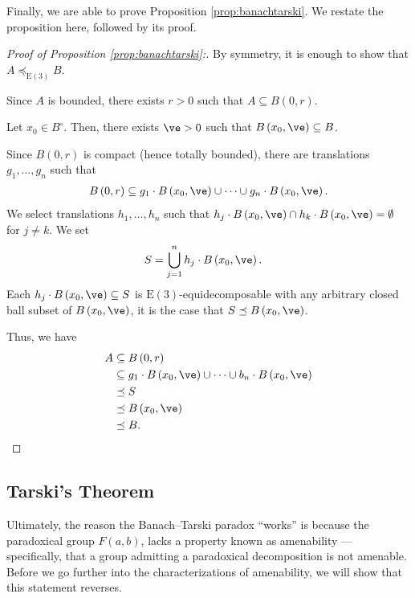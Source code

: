 \documentclass[10pt]{mypackage2}
\begin{document}
Finally, we are able to prove Proposition \ref{prop:banachtarski}. We restate the proposition here, followed by its proof.
\begin{tcolorbox}[blanker,breakable,left=3mm,before skip=10pt, after skip=10pt, borderline west={1pt}{0pt}{blue!50!white},sharp corners,]
\banachtarski*
\end{tcolorbox}
\begin{proof}[Proof of Proposition \ref{prop:banachtarski}:]
  By symmetry, it is enough to show that $A\preceq_{\text{E}(3)} B$.\newline

  Since $A$ is bounded, there exists $r > 0$ such that $A\subseteq B(0,r)$.\newline

  Let $x_0\in B^{\circ}$. Then, there exists $\ve > 0$ such that $B\left(x_0,\ve\right) \subseteq B$.\newline

  Since $B(0,r)$ is compact (hence totally bounded), there are translations $g_1,\dots,g_n$ such that
  \begin{align*}
    B\left(0,r\right) \subseteq g_1\cdot B\left(x_0,\ve\right) \cup \cdots \cup g_n\cdot B\left(x_0,\ve\right).
  \end{align*}
  We select translations $h_1,\dots,h_n$ such that $h_j\cdot B\left(x_0,\ve\right) \cap h_k\cdot B\left(x_0,\ve\right) = \emptyset$ for $j\neq k$. We set
  \begin{align*}
    S &= \bigcup_{j=1}^{n}h_j\cdot B\left(x_0,\ve\right).
  \end{align*}
  Each $h_j\cdot B\left(x_0,\ve\right)\subseteq S$ is $\text{E}(3)$-equidecomposable with any arbitrary closed ball subset of $B\left(x_0,\ve\right)$, it is the case that $S\preceq B\left(x_0,\ve\right)$.\newline

  Thus, we have
  \begin{align*}
    A &\subseteq B\left(0,r\right)\\
      &\subseteq g_1\cdot B\left(x_0,\ve\right)\cup\cdots\cup b_n\cdot B\left(x_0,\ve\right)\\
      &\preceq S\\
      &\preceq B\left(x_0,\ve\right)\\
      &\preceq B.
  \end{align*}
\end{proof}
\subsection{Tarski's Theorem}%
Ultimately, the reason the Banach--Tarski paradox ``works'' is because the paradoxical group $F(a,b)$, lacks a property known as amenability --- specifically, that a group admitting a paradoxical decomposition is not amenable. Before we go further into the characterizations of amenability, we will show that this statement reverses.\newline
\end{document}
